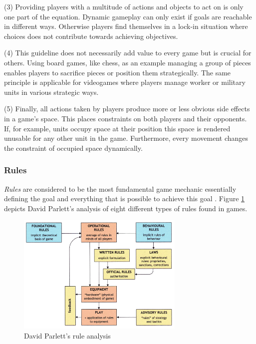 (3) Providing players with a multitude of actions and objects to act on is only one part of the equation.
Dynamic gameplay can only exist if goals are reachable in different ways.
Otherwise players find themselves in a lock-in situation where choices does not contribute towards achieving objectives.

(4) This guideline does not necessarily add value to every game but is crucial for others.
Using board games, like chess, as an example managing a group of pieces enables players to sacrifice pieces or position them strategically.
The same principle is applicable for videogames where players manage worker or military units in various strategic ways.

(5) Finally, all actions taken by players produce more or less obvious side effects in a game's space.
This places constraints on both players and their opponents.
If, for example, units occupy space at their position this space is rendered unusable for any other unit in the game. Furthermore, every movement changes the constraint of occupied space dynamically.

\subsubsection{Rules} \label{sec:mechanics-rules}
\textit{Rules} are considered to be the most fundamental game mechanic essentially defining the goal and everything that is possible to achieve this goal \cite{Schell2014}.
Figure \ref{fig:rules} depicts David Parlett's analysis of eight different types of rules found in games.

\begin{figure}[H]
    \centering
    \includegraphics[width=8cm]{assets/rules.png}
    \caption{David Parlett's rule analysis\protect\footnotemark}
    \label{fig:rules}
\end{figure}

